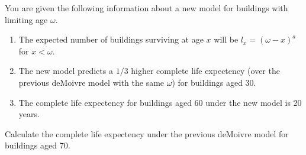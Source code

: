 You are given the following information about a new model for buildings with limiting age $\omega$.
\begin{enumerate}
\item The expected number of buildings surviving at age $x$ will be $l_x=(\omega-x)^a$ for $x<\omega$. 
\item The new model predicts a $1/3$ higher complete life expectency (over the previous deMoivre model with the same $\omega$) for buildings aged 30.
\item The complete life expectency for buildings aged 60 under the new model is 20 years. 
\end{enumerate}
Calculate the complete life expectency under the previous deMoivre model for buildings aged 70. 

